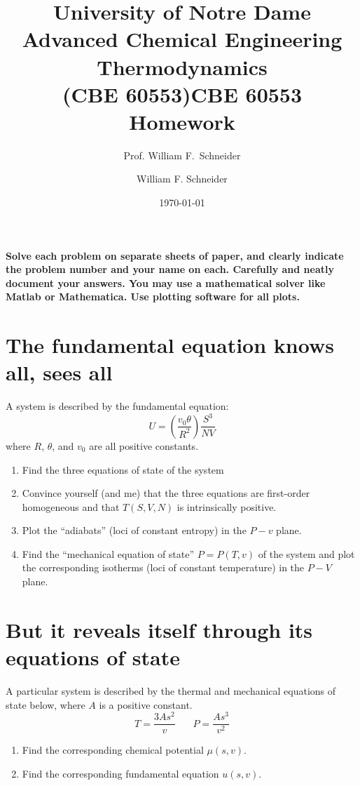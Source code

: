 \documentclass[11pt]{article}
\title{University of Notre Dame\\Advanced Chemical Engineering Thermodynamics\\(CBE 60553)}
\author{Prof. William F.\ Schneider}
\author{William F. Schneider}
\date{\today}
\title{CBE 60553 Homework}
\begin{document}
\begin{OPTIONS}
\end{OPTIONS}

\noindent \textbf{Solve each problem on separate sheets of paper, and clearly indicate the problem number and your name on each.  Carefully and neatly document your answers.  You may use a mathematical solver like Matlab or Mathematica. Use plotting software for all plots.}

\section{The fundamental equation knows all, sees all}
\label{sec:org8910be7}
A system is described by the fundamental equation:
\begin{equation}
U=\left (\frac{v_0 \theta}{R^2} \right ) \frac{S^3}{NV}\label{eq:1}
\end{equation}
where \(R\), \(\theta\), and \(v_0\) are all positive constants.

\begin{enumerate}
\item Find the three equations of state of the system

\item Convince yourself (and me) that the three equations are first-order homogeneous and that \(T(S,V,N)\) is intrinsically positive.

\item Plot the ``adiabats'' (loci of constant entropy) in the \(P-v\) plane.

\item Find the ``mechanical equation of state'' \(P=P(T,v)\) of the system and
plot the corresponding isotherms (loci of constant temperature) in the \(P-V\) plane.
\end{enumerate}

\section{But it reveals itself through its equations of state}
\label{sec:org103d9cb}
A particular system is described by the thermal and mechanical equations of state below, where \(A\) is a
  positive constant.
\begin{equation*}
  T = \frac{3 A s^2}{v}\ \ \ \ \ \ \ \ P = \frac{A s^3}{v^2}
\end{equation*}

\begin{enumerate}
\item Find the corresponding chemical potential \(\mu(s,v)\).
\item Find the corresponding fundamental equation \(u(s,v)\).
\end{enumerate}
\end{document}
